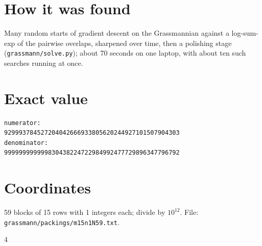 \documentclass[11pt,a4paper]{article}
\begin{document}
\section{How it was found}
Many random starts of gradient descent on the Grassmannian against a log-sum-exp of the pairwise overlaps, sharpened over time, then a polishing stage (\texttt{grassmann/solve.py}); about 70 seconds on one laptop, with about ten such searches running at once.


\appendix
\section{Exact value}
{\small
\begin{verbatim}
numerator:
929993784527204042666933805620244927101507904303
denominator:
999999999999830438224722984992477729896347796792
\end{verbatim}}

\section{Coordinates}
59 blocks of 15 rows with 1 integers each; divide by $10^{12}$. File: \texttt{grassmann/packings/m15n1N59.txt}.
{\tiny
\begin{multicols}{4}
\end{multicols}}
\end{document}
